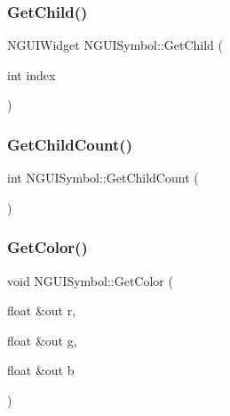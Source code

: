 \hypertarget{class_n_g_u_i_symbol_abde8eb2cc8a46acbde9120ab867e0d0a}{}\label{class_n_g_u_i_symbol_abde8eb2cc8a46acbde9120ab867e0d0a} 
\subsubsection{\texorpdfstring{Get\+Child()}{GetChild()}\hspace{0.1cm}{\footnotesize\ttfamily [2/2]}}
{\footnotesize\ttfamily N\+G\+U\+I\+Widget N\+G\+U\+I\+Symbol\+::\+Get\+Child (\begin{DoxyParamCaption}\item[{int}]{index }\end{DoxyParamCaption})}

\hypertarget{class_n_g_u_i_symbol_a0740a38011c883609a3a1e25a9c114a0}{}\label{class_n_g_u_i_symbol_a0740a38011c883609a3a1e25a9c114a0} 
\subsubsection{\texorpdfstring{Get\+Child\+Count()}{GetChildCount()}}
{\footnotesize\ttfamily int N\+G\+U\+I\+Symbol\+::\+Get\+Child\+Count (\begin{DoxyParamCaption}{ }\end{DoxyParamCaption})}

\hypertarget{class_n_g_u_i_symbol_a6e14fb615b0351c8295e1c5cbc921151}{}\label{class_n_g_u_i_symbol_a6e14fb615b0351c8295e1c5cbc921151} 
\subsubsection{\texorpdfstring{Get\+Color()}{GetColor()}}
{\footnotesize\ttfamily void N\+G\+U\+I\+Symbol\+::\+Get\+Color (\begin{DoxyParamCaption}\item[{float \&out}]{r,  }\item[{float \&out}]{g,  }\item[{float \&out}]{b }\end{DoxyParamCaption})}

\hypertarget{class_n_g_u_i_symbol_abbd0c869064777a92d28ffa294d7b93d}{}\label{class_n_g_u_i_symbol_abbd0c869064777a92d28ffa294d7b93d} 
